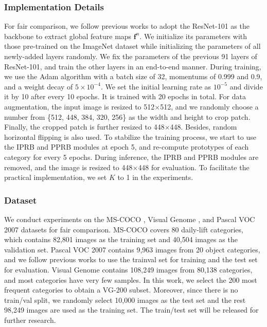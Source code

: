 \documentclass[lettersize,journal]{IEEEtran}
\begin{document}
\subsubsection{Implementation Details} 
For fair comparison, we follow previous works \cite{Chen2019SSGRL, Durand2019CVPR} to adopt the ResNet-101 \cite{He2016ResNet} as the backbone to extract global feature maps $\textbf{f}^n$. We initialize its parameters with those pre-trained on the ImageNet \cite{Deng2009Imagenet} dataset while initializing the parameters of all newly-added layers randomly. We fix the parameters of the previous 91 layers of ResNet-101, and train the other layers in an end-to-end manner. During training, we use the Adam algorithm \cite{Kingma2015Adam} with a batch size of 32, momentums of 0.999 and 0.9, and a weight decay of $5 \times 10^{-4}$. We set the initial learning rate as $10^{-5}$ and divide it by 10 after every 10 epochs. It is trained with 20 epochs in total. For data augmentation, the input image is resized to 512$\times$512, and we randomly choose a number from \{512, 448, 384, 320, 256\} as the width and height to crop patch. Finally, the cropped patch is further resized to 448$\times$448. Besides, random horizontal flipping is also used. To stabilize the training process, we start to use the IPRB and PPRB modules at epoch 5, and re-compute prototypes of each category for every 5 epochs. During inference, the IPRB and PPRB modules are removed, and the image is resized to 448$\times$448 for evaluation. To facilitate the practical implementation, we set $K$ to 1 in the experiments. 

\subsubsection{Dataset} We conduct experiments on the MS-COCO \cite{Lin2014COCO}, Visual Genome \cite{Krishna2017VG}, and Pascal VOC 2007 \cite{Everingham2010Pascal} datasets for fair comparison. MS-COCO covers 80 daily-lift categories, which contains 82,801 images as the training set and 40,504 images as the validation set. Pascal VOC 2007 contains 9,963 images from 20 object categories, and we follow previous works to use the trainval set for training and the test set for evaluation. Visual Genome contains 108,249 images from 80,138 categories, and most categories have very few samples. In this work, we select the 200 most frequent categories to obtain a VG-200 subset. Moreover, since there is no train/val split, we randomly select 10,000 images as the test set and the rest 98,249 images are used as the training set. The train/test set will be released for further research.
\end{document}

